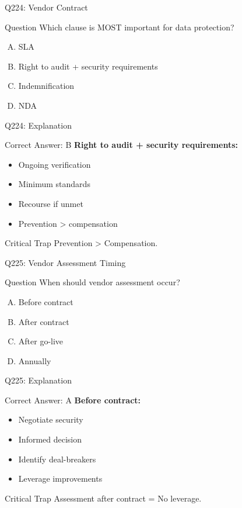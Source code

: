 \documentclass{beamer}
\begin{document}
	\begin{frame}{Q224: Vendor Contract}
		\begin{block}{Question}
			Which clause is MOST important for data protection?
		\end{block}
		\begin{enumerate}[(A)]
			\item SLA
			\item Right to audit + security requirements
			\item Indemnification
			\item NDA
		\end{enumerate}
	\end{frame}
	
	\begin{frame}{Q224: Explanation}
		\begin{block}{Correct Answer: B}
			\textbf{Right to audit + security requirements:}
			\begin{itemize}
				\item Ongoing verification
				\item Minimum standards
				\item Recourse if unmet
				\item Prevention > compensation
			\end{itemize}
		\end{block}
		\begin{alertblock}{Critical Trap}
			Prevention > Compensation.
		\end{alertblock}
	\end{frame}
	
	\begin{frame}{Q225: Vendor Assessment Timing}
		\begin{block}{Question}
			When should vendor assessment occur?
		\end{block}
		\begin{enumerate}[(A)]
			\item Before contract
			\item After contract
			\item After go-live
			\item Annually
		\end{enumerate}
	\end{frame}
	
	\begin{frame}{Q225: Explanation}
		\begin{block}{Correct Answer: A}
			\textbf{Before contract:}
			\begin{itemize}
				\item Negotiate security
				\item Informed decision
				\item Identify deal-breakers
				\item Leverage improvements
			\end{itemize}
		\end{block}
		\begin{alertblock}{Critical Trap}
			Assessment after contract = No leverage.
		\end{alertblock}
	\end{frame}
	
\end{document}

